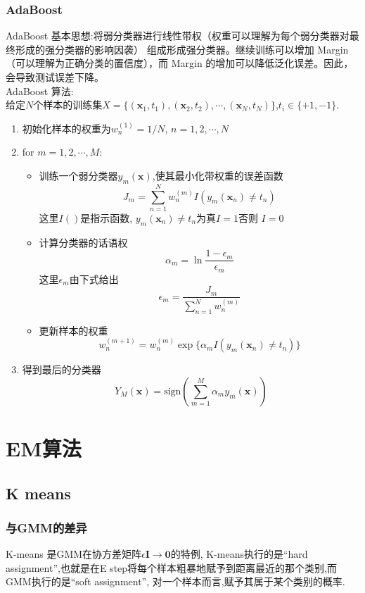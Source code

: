 \documentclass[12pt,letterpaper]{article}
\begin{document}
 \subsubsection{AdaBoost} 
 AdaBoost 基本思想:将弱分类器进行线性带权（权重可以理解为每个弱分类器对最终形成的强分类器的影响因袭） 组成形成强分类器。继续训练可以增加 Margin（可以理解为正确分类的置信度），而 Margin 的增加可以降低泛化误差。因此，会导致测试误差下降。 \\
 AdaBoost 算法: \\
 给定$N$个样本的训练集$X = \{(\bm{x}_1, t_1), (\bm{x}_2,t_2), \cdots, (\bm{x}_N,t_N) \}$,$t_i \in \{+1, -1\}$.
 \begin{enumerate}
 	\item 初始化样本的权重为$w_n^{(1)} = 1/N$, $n=1,2,\cdots,N$
 	\item for $m = 1,2,\cdots, M$:
	 \begin{itemize}
	 	\item 训练一个弱分类器$y_m(\bm{x})$,使其最小化带权重的误差函数
	 	\[
		 	J_m = \sum_{n=1}^{N} w_{n}^{(m)} I(	y_m(\bm{x}_n) \neq t_n)
	 	\]
	 	这里$I()$是指示函数, $y_m(\bm{x}_n) \neq t_n$为真$I = 1$否则 $I = 0$
	 	\item 计算分类器的话语权
	 	\[
		 	\alpha_m = \ln{	\frac{1-\epsilon_m}{\epsilon_m}}
	 	\]
	 	这里$\epsilon_m$由下式给出
	 	\[
		 	\epsilon_m = \frac{J_m}{\sum_{n=1}^{N} w_n^{(m)}}
	 	\]
	 	\item 更新样本的权重
	 	\[
		 	w_n^{(m+1)} = w_n^{(m)} \exp\{ \alpha_m I(y_m(\bm{x}_n) \neq t_n)		\}
	 	\]
	 \end{itemize}	
	 
 	\item  得到最后的分类器
 	\[
	 	Y_M(\bm{x}) = \text{sign}(\sum_{m=1}^{M} \alpha_m y_m(\bm{x}))
 	\]
 \end{enumerate}
 
 
 
\section{EM算法}	
\subsection{K means}
\subsubsection{与GMM的差异}
K-means 是GMM在协方差矩阵$\epsilon\bm{I}\rightarrow \bm{0}$的特例, K-means执行的是``hard assignment'',也就是在E step将每个样本粗暴地赋予到距离最近的那个类别,而GMM执行的是``soft assignment'', 对一个样本而言,赋予其属于某个类别的概率. 
\end{document}
